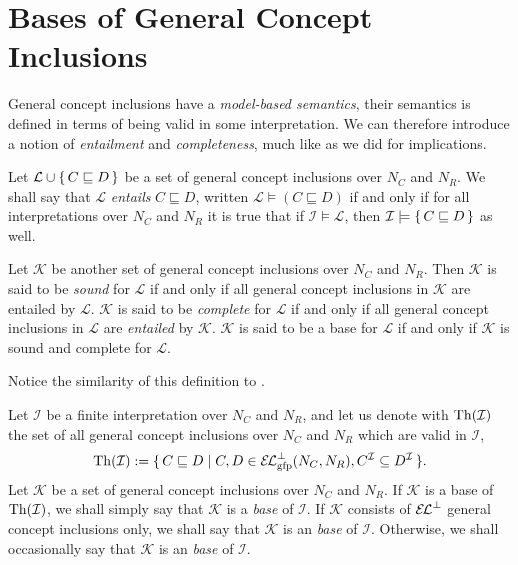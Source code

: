 \section{Bases of General Concept Inclusions}
\label{sec:bases-gener-conc}

General concept inclusions have a \emph{model-based semantics}, their semantics is defined
in terms of being valid in some interpretation.  We can therefore introduce a notion of
\emph{entailment} and \emph{completeness}, much like as we did for implications.

\begin{Definition}
  \label{def:entailment-of-gcis}
  Let $\mathcal{L} \cup {\ensuremath{\{\, C \sqsubseteq D \,\}}}$ be a set of general concept inclusions
  over $N_C$ and $N_R$.  We shall say that $\mathcal{L}$ \emph{entails} $C \sqsubseteq D$,
  written $\mathcal{L} \models (C \sqsubseteq D)$ if and only if for all interpretations
  over $N_C$ and $N_R$ it is true that if $\mathcal{I} \models \mathcal{L}$, then
  $\mathcal{I} \models {\ensuremath{\{\, C \sqsubseteq D \,\}}}$ as well.

  Let $\mathcal{K}$ be another set of general concept inclusions over $N_C$ and $N_R$.
  Then $\mathcal{K}$ is said to be \emph{sound} for $\mathcal{L}$ if and only if all
  general concept inclusions in $\mathcal{K}$ are entailed by $\mathcal{L}$.
  $\mathcal{K}$ is said to be \emph{complete} for $\mathcal{L}$ if and only if all general
  concept inclusions in $\mathcal{L}$ are \emph{entailed} by $\mathcal{K}$.  $\mathcal{K}$
  is said to be a base for $\mathcal{L}$ if and only if $\mathcal{K}$ is sound and
  complete for $\mathcal{L}$.
\end{Definition}

Notice the similarity of this definition to .

Let $\mathcal{I}$ be a finite interpretation over $N_C$ and $N_R$, and let us denote with
$\operatorname{Th}(\mathcal{I})$ the set of all \ELgfpbot general concept inclusions over $N_C$ and
$N_R$ which are valid in $\mathcal{I}$, \ie
\begin{equation*}
  \operatorname{Th}(\mathcal{I}) := {\{\, C \sqsubseteq D \mid C, D \in {\ensuremath{{\mathcal{E}\kern-.3ex\mathcal{L}}_\text{gfp}^\bot}}(N_{C}, N_{R}),
    C^{\mathcal{I}} \subseteq D^{\mathcal{I}} \,\}}.
\end{equation*}
Let $\mathcal{K}$ be a set of general concept inclusions over $N_C$ and $N_R$.  If
$\mathcal{K}$ is a base of $\operatorname{Th}(\mathcal{I})$, we shall simply say that $\mathcal{K}$ is a
\emph{base} of $\mathcal{I}$.  If $\mathcal{K}$ consists of ${{\mathcal{E}\kern-.3ex\mathcal{L}}^\bot}$ general concept
inclusions only, we shall say that $\mathcal{K}$ is an \emph{\ELbot base} of
$\mathcal{I}$.  Otherwise, we shall occasionally say that $\mathcal{K}$ is an
\emph{\ELgfpbot base} of $\mathcal{I}$.

